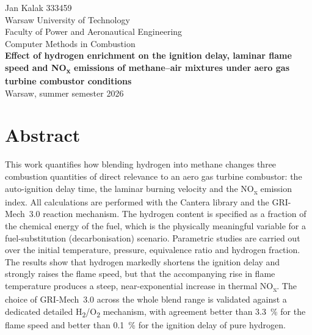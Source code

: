 \documentclass[11pt,a4paper]{article}
\begin{document}
\thispagestyle{empty}
\begin{center}
\vspace*{1.5cm}

{\large Jan Kalak 333459}\\[0.4cm]

{\large Warsaw University of Technology}\\[0.2cm]
{\large Faculty of Power and Aeronautical Engineering}\\[0.2cm]
{\large Computer Methods in Combustion}\\[2.5cm]

{\Large\bfseries Effect of hydrogen enrichment on the ignition delay,
laminar flame speed and NO\textsubscript{x} emissions of methane--air
mixtures under aero gas turbine combustor conditions}\\[2.5cm]

{\large Warsaw, summer semester 2026}

\vfill
\end{center}
\clearpage

\thispagestyle{fancy}
\section*{Abstract}
This work quantifies how blending hydrogen into methane changes three
combustion quantities of direct relevance to an aero gas turbine combustor:
the auto-ignition delay time, the laminar burning velocity and the
NO\textsubscript{x} emission index. All calculations are performed with the
Cantera library and the GRI-Mech~3.0 reaction mechanism. The hydrogen
content is specified as a fraction of the chemical energy of the fuel, which
is the physically meaningful variable for a fuel-substitution
(decarbonisation) scenario. Parametric studies are carried out over the
initial temperature, pressure, equivalence ratio and hydrogen fraction.
The results show that hydrogen markedly shortens the ignition delay and
strongly raises the flame speed, but that the accompanying rise in flame
temperature produces a steep, near-exponential increase in thermal
NO\textsubscript{x}. The choice of GRI-Mech~3.0 across the whole blend range
is validated against a dedicated detailed H\textsubscript{2}/O\textsubscript{2}
mechanism, with agreement better than \SI{3.3}{\percent} for the flame speed
and better than \SI{0.1}{\percent} for the ignition delay of pure hydrogen.
\end{document}
